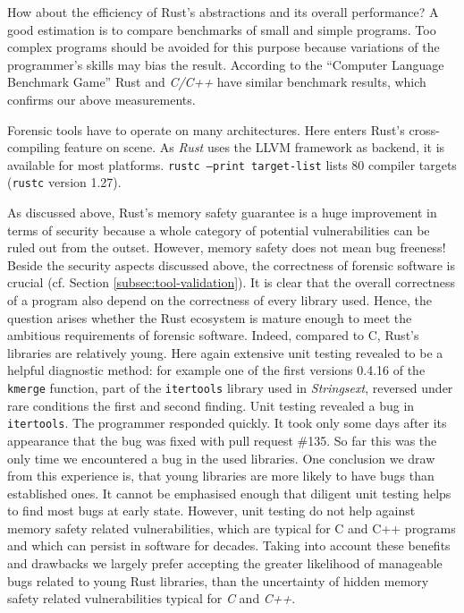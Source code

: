 \documentclass[final,5p,times,twocolumn]{elsarticle}
\begin{document}
How about the efficiency of Rust's abstractions and its overall performance? A
good estimation is to compare benchmarks of small and simple programs. Too
complex programs should be avoided for this purpose because variations of the
programmer's skills may bias the result.  According to the ``Computer Language
Benchmark Game'' \cite{fulgham2016} Rust and \emph{C/C++} have similar
benchmark results, which confirms our above measurements.

Forensic tools have to operate on many architectures. Here enters Rust's
cross-compiling feature on scene.  As \emph{Rust} uses the LLVM framework as
backend, it is available for most platforms. \texttt{rustc --print target-list}
lists 80 compiler targets (\texttt{rustc} version 1.27).

As discussed above, Rust's memory safety guarantee is a huge improvement in
terms of security because a whole category of potential vulnerabilities can be
ruled out from the outset. However, memory safety does not mean bug freeness!
Beside the security aspects discussed above, the correctness of forensic
software is crucial (cf. Section \ref{subsec:tool-validation}). It is clear that
the overall correctness of a program also depend on the correctness of every
library used.  Hence, the question arises whether the Rust ecosystem is mature
enough to meet the ambitious requirements of forensic software. Indeed, compared
to C, Rust's libraries are relatively young. Here again extensive unit testing
revealed to be a helpful diagnostic method: for example one of the first
versions 0.4.16 of the \texttt{kmerge} function, part of the \texttt{itertools}
library used in \emph{Strings­ext}, reversed under rare conditions the first and
second finding. Unit testing revealed a bug in \texttt{itertools}. The
programmer responded quickly. It took only some days after its appearance that
the bug was fixed with pull request \#135. So far this was the only time we
encountered a bug in the used libraries. One conclusion we draw from this
experience is, that young libraries are more likely to have bugs than
established ones. It cannot be emphasised enough that diligent unit testing
helps to find most bugs at early state. However, unit testing do not help
against memory safety related vulnerabilities, which are typical for C and C++
programs and which can persist in software for decades. Taking into account
these benefits and drawbacks we largely prefer accepting the greater likelihood
of manageable bugs related to young Rust libraries, than the uncertainty of
hidden memory safety related vulnerabilities typical for \emph{C} and
\emph{C++}.
\end{document}

